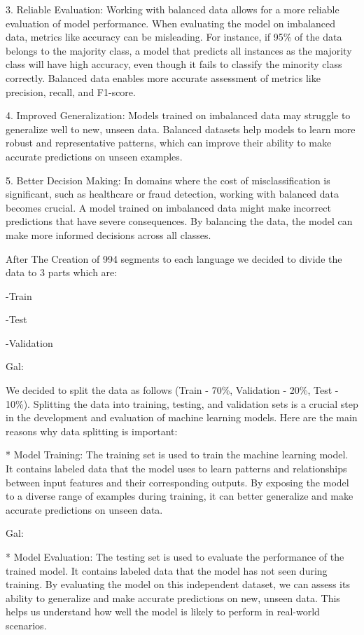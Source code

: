 \documentclass[a4paper]{article}
\begin{document}
3. Reliable Evaluation: Working with balanced data allows for a more reliable evaluation of model performance. When evaluating the model on imbalanced data, metrics like accuracy can be misleading. For instance, if 95\% of the data belongs to the majority class, a model that predicts all instances as the majority class will have high accuracy, even though it fails to classify the minority class correctly. Balanced data enables more accurate assessment of metrics like precision, recall, and F1-score.\newline

4. Improved Generalization: Models trained on imbalanced data may struggle to generalize well to new, unseen data. Balanced datasets help models to learn more robust and representative patterns, which can improve their ability to make accurate predictions on unseen examples.\newline

5. Better Decision Making: In domains where the cost of misclassification is significant, such as healthcare or fraud detection, working with balanced data becomes crucial. A model trained on imbalanced data might make incorrect predictions that have severe consequences. By balancing the data, the model can make more informed decisions across all classes.

After The Creation of 994 segments to each language we decided to divide the data to 3 parts which are:

-Train

-Test

-Validation

Gal:

We decided to split the data as follows (Train - 70\%, Validation - 20\%, Test - 10\%).
Splitting the data into training, testing, and validation sets is a crucial step in the development and evaluation of machine learning models. Here are the main reasons why data splitting is important:

* Model Training: The training set is used to train the machine learning model. It contains labeled data that the model uses to learn patterns and relationships between input features and their corresponding outputs. By exposing the model to a diverse range of examples during training, it can better generalize and make accurate predictions on unseen data.

Gal:

* Model Evaluation: The testing set is used to evaluate the performance of the trained model. It contains labeled data that the model has not seen during training. By evaluating the model on this independent dataset, we can assess its ability to generalize and make accurate predictions on new, unseen data. This helps us understand how well the model is likely to perform in real-world scenarios.
\end{document}
